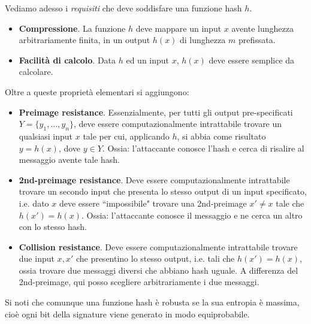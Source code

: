\noindent
Vediamo adesso i \textit{requisiti} che deve soddisfare una funzione hash $h$.
\begin{itemize}
	\item \textbf{Compressione}. La funzione $h$ deve mappare un input $x$ avente lunghezza arbitrariamente finita, in un output $h(x)$ di lunghezza $m$ prefissata.
	\item \textbf{Facilità di calcolo}. Data $h$ ed un input $x$, $h(x)$ deve essere semplice da calcolare.
\end{itemize}
Oltre a queste proprietà elementari si aggiungono:
\begin{itemize}
	\item \textbf{Preimage resistance}. Essenzialmente, per tutti gli output pre-specificati $Y=\{y_1,\dots,y_n\}$, deve essere computazionalmente intrattabile trovare un qualsiasi input $x$ tale per cui, applicando $h$, si abbia come risultato $y=h(x)$, dove $y\in Y$. Ossia: l'attaccante conosce l'hash e cerca di risalire al messaggio avente tale hash.
	\item \textbf{2nd-preimage resistance}. Deve essere computazionalmente intrattabile trovare un secondo input che presenta lo stesso output di un input specificato, i.e. dato $x$ deve essere \textquotedblleft impossibile" trovare una 2nd-preimage $x'\neq x$ tale che $h(x') = h(x)$. Ossia: l'attaccante conosce il messaggio e ne cerca un altro con lo stesso hash. 
	\item \textbf{Collision resistance}. Deve essere computazionalmente intrattabile trovare due input $x, x'$ che presentino lo stesso output, i.e. tali che $h(x') = h(x)$, ossia trovare due messaggi diversi che abbiano hash uguale. A differenza del 2nd-preimage, qui posso scegliere arbitrariamente i due messaggi.
\end{itemize}
Si noti che comunque una funzione hash è robusta se la sua entropia è massima, cioè ogni bit della signature viene generato in modo equiprobabile. 


